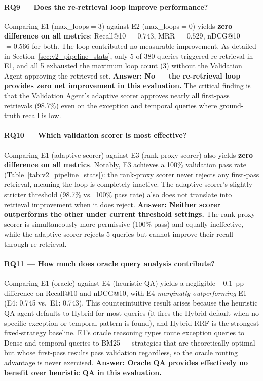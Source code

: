 \paragraph{RQ9 --- Does the re-retrieval loop improve performance?}

Comparing E1 (max\_loops${=}3$) against E2 (max\_loops${=}0$) yields \textbf{zero difference on all metrics}: Recall@10 $= 0.743$, MRR $= 0.529$, nDCG@10 $= 0.566$ for both. The loop contributed no measurable improvement. As detailed in Section~\ref{sec:v2_pipeline_stats}, only 5 of 380 queries triggered re-retrieval in E1, and all 5 exhausted the maximum loop count (3) without the Validation Agent approving the retrieved set. \textbf{Answer: No --- the re-retrieval loop provides zero net improvement in this evaluation.} The critical finding is that the Validation Agent's adaptive scorer approves nearly all first-pass retrievals (98.7\%) even on the exception and temporal queries where ground-truth recall is low.

\paragraph{RQ10 --- Which validation scorer is most effective?}

Comparing E1 (adaptive scorer) against E3 (rank-proxy scorer) also yields \textbf{zero difference on all metrics}. Notably, E3 achieves a 100\% validation pass rate (Table~\ref{tab:v2_pipeline_stats}): the rank-proxy scorer never rejects any first-pass retrieval, meaning the loop is completely inactive. The adaptive scorer's slightly stricter threshold (98.7\% vs.\ 100\% pass rate) also does not translate into retrieval improvement when it does reject. \textbf{Answer: Neither scorer outperforms the other under current threshold settings.} The rank-proxy scorer is simultaneously more permissive (100\% pass) and equally ineffective, while the adaptive scorer rejects 5 queries but cannot improve their recall through re-retrieval.

\paragraph{RQ11 --- How much does oracle query analysis contribute?}

Comparing E1 (oracle) against E4 (heuristic QA) yields a negligible $-0.1$~pp difference on Recall@10 and nDCG@10, with E4 \emph{marginally outperforming} E1 (E4: 0.745 vs.\ E1: 0.743). This counterintuitive result arises because the heuristic QA agent defaults to Hybrid for most queries (it fires the Hybrid default when no specific exception or temporal pattern is found), and Hybrid RRF is the strongest fixed-strategy baseline. E1's oracle reasoning types route exception queries to Dense and temporal queries to BM25 --- strategies that are theoretically optimal but whose first-pass results pass validation regardless, so the oracle routing advantage is never exercised. \textbf{Answer: Oracle QA provides effectively no benefit over heuristic QA in this evaluation.}

